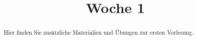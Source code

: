 \documentclass{ximera}
\title{Woche 1}
\begin{document}
\begin{abstract}
Hier finden Sie zusätzliche Materialien und Übungen zur ersten Vorlesung.
\end{abstract}
\maketitle
\end{document}
